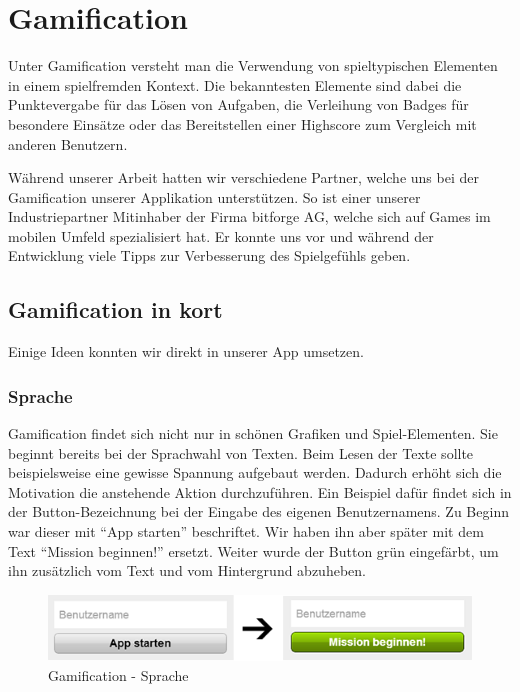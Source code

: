\chapter{Gamification}
\label{gamification}

Unter Gamification versteht man die Verwendung von spieltypischen Elementen in einem spielfremden Kontext.
Die bekanntesten Elemente sind dabei die Punktevergabe für das Lösen von Aufgaben, die Verleihung von Badges für besondere Einsätze oder das Bereitstellen einer Highscore zum Vergleich mit anderen Benutzern.

Während unserer Arbeit hatten wir verschiedene Partner, welche uns bei der Gamification unserer Applikation unterstützen.
So ist einer unserer Industriepartner Mitinhaber der Firma bitforge AG, welche sich auf Games im mobilen Umfeld spezialisiert hat.
Er konnte uns vor und während der Entwicklung viele Tipps zur Verbesserung des Spielgefühls geben.

\section{Gamification in kort}
Einige Ideen konnten wir direkt in unserer App umsetzen.

\subsection{Sprache}
Gamification findet sich nicht nur in schönen Grafiken und Spiel-Elementen.
Sie beginnt bereits bei der Sprachwahl von Texten.
Beim Lesen der Texte sollte beispielsweise eine gewisse Spannung aufgebaut werden.
Dadurch erhöht sich die Motivation die anstehende Aktion durchzuführen.
Ein Beispiel dafür findet sich in der Button-Bezeichnung bei der Eingabe des eigenen Benutzernamens.
Zu Beginn war dieser mit "`App starten"' beschriftet.
Wir haben ihn aber später mit dem Text "`Mission beginnen!"' ersetzt.
Weiter wurde der Button grün eingefärbt, um ihn zusätzlich vom Text und vom Hintergrund abzuheben.

\begin{figure}[H]
	\centering
	\includegraphics{images/gamification/gamification-lang-firststeps}
	\caption{Gamification - Sprache}
	\label{gamification-lang-firststeps}
\end{figure}

